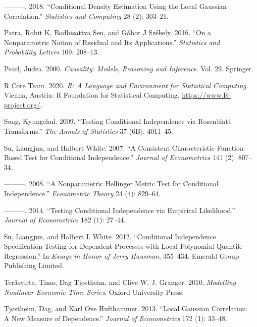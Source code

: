 \documentclass[
  12pt,
  letterpaper]{article}
\newlength{\cslhangindent}
\newenvironment{cslreferences}%
  {\setlength{\parindent}{0pt}%
  \everypar{\setlength{\hangindent}{\cslhangindent}}\ignorespaces}%
  {\par}
\theoremstyle{definition}
\theoremstyle{definition}
\theoremstyle{definition}
\theoremstyle{remark}
\begin{document}
\begin{cslreferences}
\leavevmode\hypertarget{ref-otneim2017conditional}{}%
---------. 2018. ``Conditional Density Estimation Using the Local Gaussian Correlation.'' \emph{Statistics and Computing} 28 (2): 303--21.

\leavevmode\hypertarget{ref-patra2016on}{}%
Patra, Rohit K, Bodhisattva Sen, and Gábor J Székely. 2016. ``On a Nonparametric Notion of Residual and Its Applications.'' \emph{Statistics and Probability Letters} 109: 208--13.

\leavevmode\hypertarget{ref-pearl2000causality}{}%
Pearl, Judea. 2000. \emph{Causality: Models, Reasoning and Inference}. Vol. 29. Springer.

\leavevmode\hypertarget{ref-r}{}%
R Core Team. 2020. \emph{R: A Language and Environment for Statistical Computing}. Vienna, Austria: R Foundation for Statistical Computing. \url{https://www.R-project.org/}.

\leavevmode\hypertarget{ref-song2009testing}{}%
Song, Kyungchul. 2009. ``Testing Conditional Independence via Rosenblatt Transforms.'' \emph{The Annals of Statistics} 37 (6B): 4011--45.

\leavevmode\hypertarget{ref-su2007consistent}{}%
Su, Liangjun, and Halbert White. 2007. ``A Consistent Characteristic Function-Based Test for Conditional Independence.'' \emph{Journal of Econometrics} 141 (2): 807--34.

\leavevmode\hypertarget{ref-su2008nonparametric}{}%
---------. 2008. ``A Nonparametric Hellinger Metric Test for Conditional Independence.'' \emph{Econometric Theory} 24 (4): 829--64.

\leavevmode\hypertarget{ref-su2014testing}{}%
---------. 2014. ``Testing Conditional Independence via Empirical Likelihood.'' \emph{Journal of Econometrics} 182 (1): 27--44.

\leavevmode\hypertarget{ref-su2012conditional}{}%
Su, Liangjun, and Halbert L White. 2012. ``Conditional Independence Specification Testing for Dependent Processes with Local Polynomial Quantile Regression.'' In \emph{Essays in Honor of Jerry Hausman}, 355--434. Emerald Group Publishing Limited.

\leavevmode\hypertarget{ref-terasvirta2010modelling}{}%
Teräsvirta, Timo, Dag Tjøstheim, and Clive W. J. Granger. 2010. \emph{Modelling Nonlinear Economic Time Series}. Oxford University Press.

\leavevmode\hypertarget{ref-tjostheim2013local}{}%
Tjøstheim, Dag, and Karl Ove Hufthammer. 2013. ``Local Gaussian Correlation: A New Measure of Dependence.'' \emph{Journal of Econometrics} 172 (1): 33--48.


\end{cslreferences}
\end{document}
